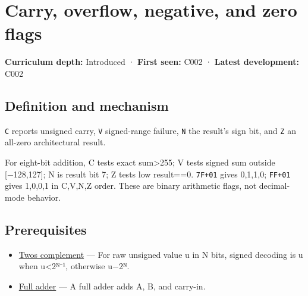 \hypertarget{appendix-8d687c9c08ab}{}\label{referencestart:appendix-8d687c9c08ab}
\section{Carry, overflow, negative, and zero flags}\label{appendix-8d687c9c08ab-carry-overflow-negative-and-zero-flags}

\hypertarget{appendix-8d687c9c08ab-carry-overflow-negative-and-zero-flags}{}

\textbf{Curriculum depth:} Introduced · \textbf{First seen:} C002 · \textbf{Latest development:} C002

\begin{allmightroledefinition}

\subsection{Definition and mechanism}\label{appendix-8d687c9c08ab-definition-and-mechanism}

\hypertarget{appendix-8d687c9c08ab-definition-and-mechanism}{}

\texttt{C} reports unsigned carry, \texttt{V} signed-range failure, \texttt{N} the result's sign bit, and \texttt{Z} an all-zero architectural result.

\end{allmightroledefinition}

For eight-bit addition, C tests exact sum\textgreater255; V tests signed sum outside {[}−128,127{]}; N is result bit 7; Z tests low result==0. \texttt{7F+01} gives 0,1,1,0; \texttt{FF+01} gives 1,0,0,1 in C,V,N,Z order. These are binary arithmetic flags, not decimal-mode behavior.

\subsection{Prerequisites}\label{appendix-8d687c9c08ab-prerequisites}

\hypertarget{appendix-8d687c9c08ab-prerequisites}{}

\begin{itemize}
\tightlist
\item
  \hyperref[appendix-4fbc03d20829]{Two\textquotesingle s complement} --- For raw unsigned value u in N bits, signed decoding is u when u\textless2ᴺ⁻¹, otherwise u−2ᴺ.
\item
  \hyperref[appendix-d1a5b1e520c2]{Full adder} --- A full adder adds A, B, and carry-in.
\end{itemize}

